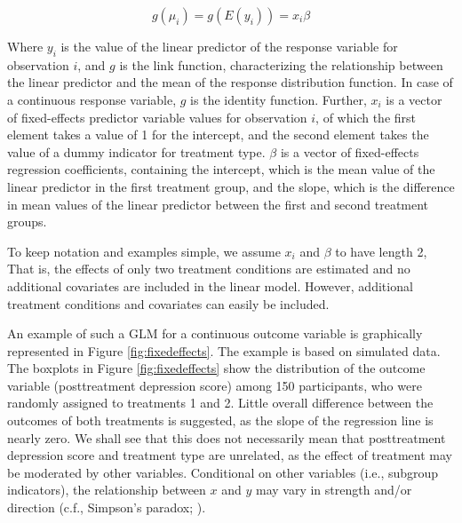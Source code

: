\documentclass[nobf,doc]{apa}
\begin{document}
\begin{equation}
\label{eq:fixedeffects}
	g(\mu_{i}) = g(E(y_{i})) = x_{i}\beta
\end{equation}

Where $y_i$ is the value of the linear predictor of the response variable for observation $i$, and $g$ is the link function, characterizing the relationship between the linear predictor and the mean of the response distribution function. In case of a continuous response variable, $g$ is the identity function. Further, $x_{i}$ is a vector of fixed-effects predictor variable values for observation $i$, of which the first element takes a value of 1 for the intercept, and the second element takes the value of a dummy indicator for treatment type. $\beta$ is a vector of fixed-effects regression coefficients, containing the intercept, which is the mean value of the linear predictor in the first treatment group, and the slope, which is the difference in mean values of the linear predictor between the first and second treatment groups.  

To keep notation and examples simple, we assume $x_{i}$ and $\beta$ to have length 2, That is, the effects of only two treatment conditions are estimated and no additional covariates are included in the linear model. However, additional treatment conditions and covariates can easily be included.

An example of such a GLM for a continuous outcome variable is graphically represented in Figure \ref{fig:fixedeffects}. The example is based on simulated data. The boxplots in Figure \ref{fig:fixedeffects} show the distribution of the outcome variable (posttreatment depression score) among 150 participants, who were randomly assigned to treatments 1 and 2. Little overall difference between the outcomes of both treatments is suggested, as the slope of the regression line is nearly zero. We shall see that this does not necessarily mean that posttreatment depression score and treatment type are unrelated, as the effect of treatment may be moderated by other variables. Conditional on other variables (i.e., subgroup indicators), the relationship between $x$ and $y$ may vary in strength and/or direction (c.f., Simpson's paradox; ).
\end{document}

